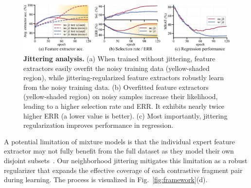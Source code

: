 \documentclass{article}
\theoremstyle{plain}
\theoremstyle{definition}
\theoremstyle{remark}
\begin{document}
\begin{figure}[t]
\begin{center}
\centerline{\includegraphics[width=1.0\textwidth]{imgs/jitter_analysis_neurips.pdf}}
\vskip -0.1in
\caption{\textbf{Jittering analysis.}
(a) When trained without jittering, feature extractors easily overfit the noisy training data (yellow-shaded region), while jittering-regularized feature extractors robustly learn from the noisy training data. %
(b) Overfitted feature extractors (yellow-shaded region) on noisy samples increase their likelihood, leading to a higher selection rate and ERR. 
It exhibits nearly twice higher ERR (a lower value is better).
(c) Most importantly, jittering regularization improves performance in regression.
}
\label{fig:jitter_analysis}
\end{center}
\vskip -0.2in
\end{figure}

A potential limitation of mixture models is that the individual expert feature extractor may not fully benefit from the full dataset as they model their own disjoint subsets~\citep{dukler23}.
Our neighborhood jittering mitigates this limitation as a robust regularizer that expands the effective coverage of each contrastive fragment pair during learning.
The process is visualized in Fig.~\ref{fig:framework}(d).
\end{document}
